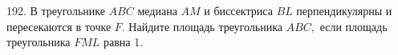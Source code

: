 192. В треугольнике $ABC$ медиана $AM$ и биссектриса $BL$ перпендикулярны и пересекаются в точке $F.$ Найдите площадь треугольника $ABC,$ если площадь треугольника $FML$ равна 1.\\
